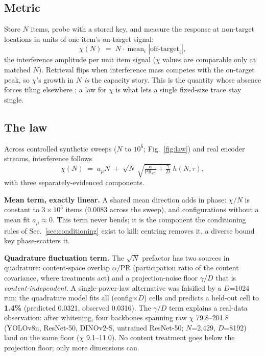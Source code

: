 \documentclass[conference]{IEEEtran}
\begin{document}
\subsection{Metric}
Store $N$ items, probe with a stored key, and measure the response at
non-target locations in units of one item's on-target signal:
\begin{equation}
\chi(N) \;=\; N \cdot \operatorname{mean}_i \left| \text{off-target}_i \right|,
\label{eq:chi}
\end{equation}
the interference amplitude per unit item signal ($\chi$ values are
comparable only at matched $N$). Retrieval flips when interference mass
competes with the on-target peak, so $\chi$'s growth in $N$ \emph{is} the
capacity story. This is the quantity whose absence forces tiling
elsewhere \cite{snyder2026vsaogm}; a law for $\chi$ is what lets a single
fixed-size trace stay single.

\subsection{The law}
Across controlled synthetic sweeps ($N$ to $10^6$; Fig.~\ref{fig:law})
and real encoder streams, interference follows
\begin{equation}
\chi(N) \;=\; a_\mu N \;+\; \sqrt{N}\,
\sqrt{\tfrac{\alpha}{\mathrm{PR}_{\mathrm{eff}}} + \tfrac{\gamma}{D}}\;
h(N,\tau),
\label{eq:law}
\end{equation}
with three separately-evidenced components.

\textbf{Mean term, exactly linear.} A shared mean direction adds in
phase: $\chi/N$ is constant to $3\times10^{5}$ items (0.0083 across the
sweep), and configurations without a mean fit $a_\mu \approx 0$. This
term never bends; it is the component the conditioning rules of
Sec.~\ref{sec:conditioning} exist to kill: centring removes it, a diverse
bound key phase-scatters it.

\textbf{Quadrature fluctuation term.} The $\sqrt{N}$ prefactor has two
sources in quadrature: content-space overlap $\alpha/\mathrm{PR}$
(participation ratio of the content covariance, where treatments act) and
a projection-noise floor $\gamma/D$ that is \emph{content-independent}. A
single-power-law alternative was falsified by a $D$=1024 run; the
quadrature model fits all (config$\times D$) cells and predicts a
held-out cell to \textbf{1.4\%} (predicted 0.0321, observed 0.0316). The
$\gamma/D$ term explains a real-data observation: after whitening, four
backbones spanning raw $\chi$ 79.8--201.8 (YOLOv8n, ResNet-50, DINOv2-S,
untrained ResNet-50; $N$=2{,}429, $D$=8192) land on the same floor
($\chi$ 9.1--11.0). No content treatment goes below the projection floor;
only more dimensions can.
\end{document}
